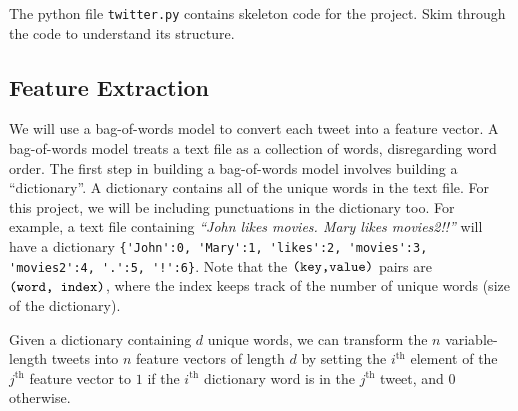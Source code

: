 \documentclass[11pt]{article}
\begin{document}
The python file \verb|twitter.py| contains skeleton code for the project. Skim through the code to understand its structure.
\fi




\subsection{Feature Extraction }\label{sec:features}

We will use a bag-of-words model to convert each tweet into a feature vector. A bag-of-words model treats a text file as a collection of words, disregarding word order. The first step in building a bag-of-words model involves building a ``dictionary''. A dictionary contains all of the unique words in the text file. For this project, we will be including punctuations in the dictionary too. For example, a text file containing \textit{``John likes movies. Mary likes movies2!!''} will have a dictionary \verb|{'John':0, 'Mary':1, 'likes':2, 'movies':3, 'movies2':4, '.':5, '!':6}|. Note that the $\verb|(key,value)|$ pairs are $\verb|(word, index)|$, where the index keeps track of the number of unique words (size of the dictionary).

Given a dictionary containing $d$ unique words, we can transform the $n$ variable-length tweets into $n$ feature vectors of length $d$ by setting the $i^\textrm{th}$ element of the $j^\textrm{th}$ feature vector to $1$ if the $i^\textrm{th}$ dictionary word is in the $j^\textrm{th}$ tweet, and $0$ otherwise.
\end{document}
